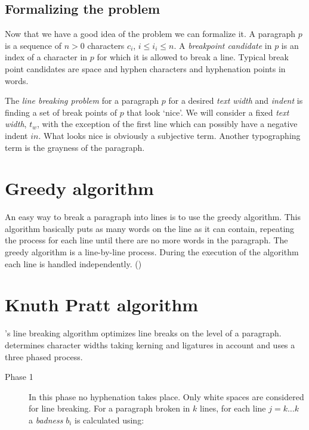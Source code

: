 {{\subsection{Formalizing the problem}

Now that we have a good idea of the problem we can formalize it. A paragraph $p$ is a sequence of $n>0$ characters $c_i$,  $i\leq i_i \leq n$.
A \textit{breakpoint candidate} in $p$ is an index of a character in $p$ for which it is allowed to break a line. Typical break point candidates are space and hyphen characters and hyphenation points in words.

The \textit{line breaking problem} for a paragraph $p$ for a desired \textit{text width} and \textit{indent} is finding a set of break points of $p$ that look `nice'. We will consider a fixed \textit{text width}, $t_w$, with the exception of the first line which can possibly have a negative indent $in$. What looks nice is obviously a subjective term. Another typographing term is the grayness of the paragraph. 

\section{Greedy algorithm}

An easy way to break a paragraph into lines is to use the greedy algorithm. This algorithm basically puts as many 
words on the line as it can contain, repeating the process for each line until there are no more words in the paragraph. The greedy algorithm is a line-by-line process. During the execution of the algorithm each line is handled independently. (\citep{elyaakoubi})



\section{Knuth Pratt algorithm}
\tex's line breaking algorithm optimizes line breaks on the level of a paragraph. \tex determines character widths taking kerning and ligatures in account and uses a three phased process. 

\begin{description}
\item[Phase 1] In this phase no hyphenation takes place. Only white spaces are considered  for line breaking. For a paragraph broken in $k$ lines, for each line $j=k\ldots k$  a \textit{badness} $b_i$ is calculated using:


\end{description}}}
